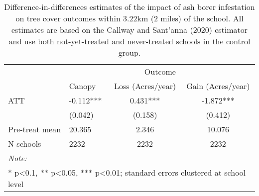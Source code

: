 \begin{table}[!h]

\caption{\label{tab:school-tree-table}Difference-in-differences estimates of the impact of ash borer infestation on tree cover outcomes within 3.22km (2 miles) of the school. All estimates are based on the Callway and Sant'anna (2020) estimator and use both not-yet-treated and never-treated schools in the control group.}
\centering
\begin{tabular}[t]{llcc}
\toprule
\multicolumn{1}{c}{ } & \multicolumn{3}{c}{Outcome} \\
\cmidrule(l{3pt}r{3pt}){2-4}
  & Canopy & Loss (Acres/year) & Gain (Acres/year)\\
\midrule
ATT & -0.112*** & 0.431*** & -1.872***\\
 & (0.042) & (0.158) & (0.412)\\
\midrule
Pre-treat mean & 20.365 & 2.346 & 10.076\\
N schools & 2232 & 2232 & 2232\\
\bottomrule
\multicolumn{4}{l}{\rule{0pt}{1em}\textit{Note: }}\\
\multicolumn{4}{l}{\rule{0pt}{1em}* p<0.1, ** p<0.05, *** p<0.01; standard errors clustered at school level}\\
\end{tabular}
\end{table}
